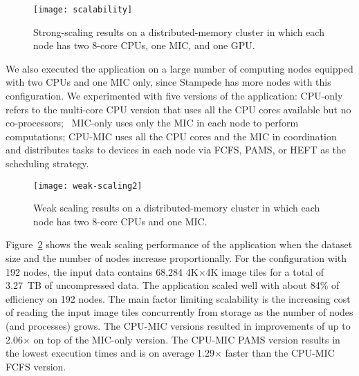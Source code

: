 \begin{figure}[h!]
	\centering
	\texttt{[image: scalability]}
	\vspace{-1ex}
	\caption{Strong-scaling results on a distributed-memory cluster in which each 
	node has two 8-core CPUs, one MIC, and one GPU.}
	\label{fig:scalability}
	\vspace{-2ex}
\end{figure}


We also executed the application on a large number of computing nodes equipped 
with two CPUs and one MIC only, since Stampede has more nodes with this configuration.
We experimented with five versions of the application:
CPU-only refers to the multi-core CPU version that uses all the 
CPU cores available but no co-processors; ~MIC-only uses only the MIC 
in each node to perform computations;
CPU-MIC uses all the CPU cores and the MIC in coordination and 
distributes tasks to devices in each node via FCFS, PAMS, or HEFT as
the scheduling strategy.  
\begin{figure}[htb!]
\begin{center}
	\texttt{[image: weak-scaling2]}\vspace*{-1ex}
	\caption{Weak scaling results on a distributed-memory cluster in which each node 
	has 	two 8-core CPUs and one MIC.}
	\vspace*{-2ex}
\label{fig:weak-scale-general}
\end{center}
\end{figure}

Figure~\ref{fig:weak-scale-general} shows the weak scaling performance of 
the application when the
dataset size and the number of nodes increase proportionally. For the
configuration with 192 nodes, the input data contains 68,284 4K$\times$4K image
tiles for a total of 3.27~TB of uncompressed data. The application
scaled well with about 84\% of efficiency on 192 nodes. The main factor limiting scalability is the
increasing cost of reading the input image tiles concurrently from storage as the
number of nodes (and processes) grows. The CPU-MIC versions resulted in improvements of 
up to 2.06$\times$ on top of the MIC-only version. 
The CPU-MIC PAMS version results in the lowest execution times and is 
on average 1.29$\times$ faster than the CPU-MIC FCFS version. 


